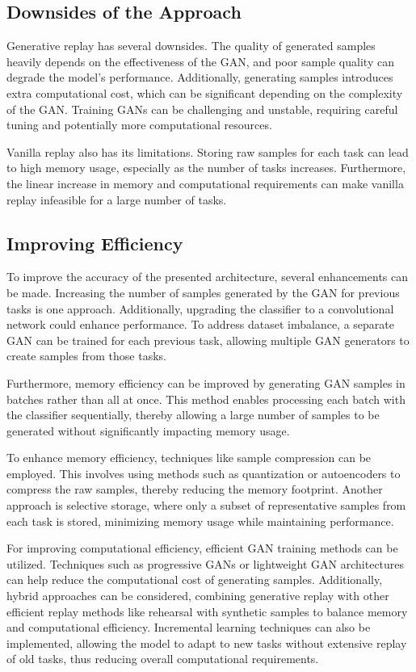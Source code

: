 \documentclass{article}
\begin{document}
\subsection{Downsides of the Approach}
Generative replay has several downsides. The quality of generated samples heavily depends on the effectiveness of the GAN, and poor sample quality can degrade the model's performance. Additionally, generating samples introduces extra computational cost, which can be significant depending on the complexity of the GAN. Training GANs can be challenging and unstable, requiring careful tuning and potentially more computational resources.

Vanilla replay also has its limitations. Storing raw samples for each task can lead to high memory usage, especially as the number of tasks increases. Furthermore, the linear increase in memory and computational requirements can make vanilla replay infeasible for a large number of tasks.

\subsection{Improving Efficiency}
\label{sec:improving}
To improve the accuracy of the presented architecture, several enhancements can be made. Increasing the number of samples generated by the GAN for previous tasks is one approach. Additionally, upgrading the classifier to a convolutional network could enhance performance. To address dataset imbalance, a separate GAN can be trained for each previous task, allowing multiple GAN generators to create samples from those tasks.

Furthermore, memory efficiency can be improved by generating GAN samples in batches rather than all at once. This method enables processing each batch with the classifier sequentially, thereby allowing a large number of samples to be generated without significantly impacting memory usage.

To enhance memory efficiency, techniques like sample compression can be employed. This involves using methods such as quantization or autoencoders to compress the raw samples, thereby reducing the memory footprint. Another approach is selective storage, where only a subset of representative samples from each task is stored, minimizing memory usage while maintaining performance.

For improving computational efficiency, efficient GAN training methods can be utilized. Techniques such as progressive GANs or lightweight GAN architectures can help reduce the computational cost of generating samples. Additionally, hybrid approaches can be considered, combining generative replay with other efficient replay methods like rehearsal with synthetic samples to balance memory and computational efficiency. Incremental learning techniques can also be implemented, allowing the model to adapt to new tasks without extensive replay of old tasks, thus reducing overall computational requirements.
\end{document}
